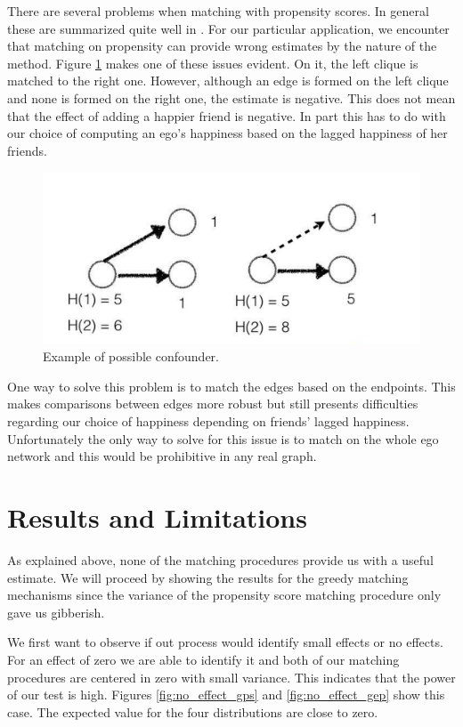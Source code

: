 \documentclass[11pt]{article}
\begin{document}
There are several problems when matching with propensity scores. In general these are summarized quite well in \cite{king2007politically}. For our particular application, we encounter that matching on propensity can provide wrong estimates by the nature of the method. Figure \ref{fig:treatment} makes one of these issues evident. On it, the left clique is matched to the right one. However, although an edge is formed on the left clique and none is formed on the right one, the estimate is negative. This does not mean that the effect of adding a happier friend is negative. In part this has to do with our choice of computing an ego’s happiness based on the lagged happiness of her friends.\\

\begin{figure}[h]
\centering
\includegraphics[scale=.3]{graph}
\caption{Example of possible confounder.}
\label{fig:treatment}
\end{figure}

One way to solve this problem is to match the edges based on the endpoints. This makes comparisons between edges more robust but still presents difficulties regarding our choice of happiness depending on friends' lagged happiness. Unfortunately the only way to solve for this issue is to match on the whole ego network and this would be prohibitive in any real graph.


\section{Results and Limitations}
\label{Results}

As explained above, none of the matching procedures provide us with a useful estimate. We will proceed by showing the results for the greedy matching mechanisms since the variance of the propensity score matching procedure only gave us gibberish.

We first want to observe if out process would identify small effects or no effects. For an effect of zero we are able to identify it and both of our matching procedures are centered in zero with small variance. This indicates that the power of our test is high. Figures \ref{fig:no_effect_gps} and \ref{fig:no_effect_gep} show this case. The expected value for the four distributions are close to zero.
\end{document}
